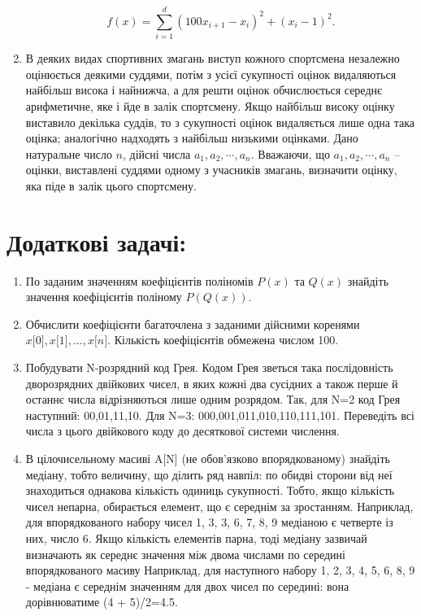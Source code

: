\documentclass[a5paper,titlepage,openany,twoside,draft]{book_unv}%
\begin{document}
\begin{enumerate}
  $$ f(x) = \sum\limits_{i=1}^{d} (100x_{i+1} -x_{i})^{2} + (x_{i}-1)^2. $$  

\item
  В деяких видах спортивних змагань виступ кожного спортсмена незалежно
  оцінюється деякими суддями, потім з усієї сукупності оцінок
  видаляються найбільш висока і найнижча, а для решти оцінок
  обчислюється середнє арифметичне, яке і йде в залік спортсмену. Якщо
  найбільш високу оцінку виставило декілька суддів, то з сукупності
  оцінок видаляється лише одна така оцінка; аналогічно надходять з
  найбільш низькими оцінками. Дано натуральне число $n$, дійсні числа
  \(a_{1},a_{2},\cdots,a_{n}\). Вважаючи, що
  \(a_{1},a_{2},\cdots,a_{n}\) -- оцінки, виставлені суддями одному з
  учасників змагань, визначити оцінку, яка піде в залік цього
  спортсмену.
\end{enumerate}

\section{Додаткові задачі:}

\begin{enumerate}
\def\labelenumi{\arabic{enumi})}
\setcounter{enumi}{17}
\item
По заданим значенням коефіцієнтів поліномів $P(x)$ та $Q(x)$ знайдіть
значення коефіцієнтів поліному $P(Q(x))$.
\item
  Обчислити коефіцієнти багаточлена з заданими дійсними коренями 
$ x{[}0{]},x{[}1{]}, \ldots{}, x{[}n{]}$. Кількість коефіцієнтів обмежена
  числом 100.
\item
  Побудувати N-розрядний код Грея. Кодом Грея зветься така послідовність
  дворозрядних двійкових чисел, в яких кожні два сусідних а також перше
  й останнє числа відрізняються лише одним розрядом. Так, для N=2 код
  Грея наступний: 00,01,11,10. Для N=3: 000,001,011,010,110,111,101.
  Переведіть всі числа з цього двійкового коду до десяткової системи
  числення.
\item
  В цілочисельному масиві A{[}N{]} (не обов'язково впорядкованому)
  знайдіть медіану, тобто величину, що ділить ряд навпіл: по обидві
  сторони від неї знаходиться однакова кількість одиниць сукупності.
  Тобто, якщо кількість чисел непарна, обирається елемент, що є середнім
  за зростанням. Наприклад, для впорядкованого набору чисел 1, 3, 3, 6,
  7, 8, 9 медіаною є четверте із них, число 6. Якщо кількість елементів
  парна, тоді медіану зазвичай визначають як середнє значення між двома
  числами по середині впорядкованого масиву Наприклад, для наступного
  набору 1, 2, 3, 4, 5, 6, 8, 9 - медіана є середнім значенням для двох
  чисел по середині: вона дорівнюватиме (4 + 5)/2=4.5.
\end{enumerate}
\end{document}
